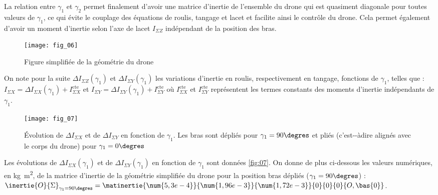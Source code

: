 \ifprof
\begin{corrige}

\end{corrige}
\else
\fi


La relation entre $\gamma_1$ et $\gamma_2$ permet finalement d’avoir une matrice d’inertie de l’ensemble du
drone qui est quasiment diagonale pour toutes valeurs de $\gamma_1$, ce qui évite le couplage des
équations de roulis, tangage et lacet et facilite ainsi le contrôle du drone. Cela permet également d’avoir un moment d’inertie selon l’axe de lacet  $I_{\Sigma Z}$ indépendant de la position des
bras.

\begin{figure}[H]
\centering
\texttt{[image: fig\_06]}
\caption{\label{fig:06}  Figure simplifiée de la géométrie du drone}
\end{figure}

On note pour la suite $\Delta I_{\Sigma Z} (\gamma_1)$ et $\Delta I_{\Sigma Y} (\gamma_1)$  les variations d’inertie en roulis, respectivement en tangage, fonctions de $\gamma_1$, 
telles que : $I_{\Sigma X} = \Delta I_{\Sigma X} (\gamma_1) + I_{\Sigma X}^{\text{cte}}$ 
et 
$I_{\Sigma Y} = \Delta I_{\Sigma Y} (\gamma_1) + I_{\Sigma Y}^{\text{cte}}$ 
où $I_{\Sigma X}^{\text{cte}}$ et $I_{\Sigma Y}^{\text{cte}}$
représentent les termes constants des moments d’inertie indépendants de $\gamma_1$.


\begin{figure}[H]
\centering
\texttt{[image: fig\_07]}
\caption{\label{fig:07}  Évolution de $\Delta I_{\Sigma X}$ et de $\Delta I_{\Sigma Y}$ en fonction de $\gamma_1$. Les bras sont dépliés pour $\gamma_1 = 90\degres$
et pliés (c’est-­-à­dire alignés avec le corps du drone) pour $\gamma_1 = 0\degres$}
\end{figure}

Les évolutions de $\Delta I_{\Sigma X} (\gamma_1)$ et de $\Delta I_{\Sigma Y} (\gamma_1)$ en fonction de $\gamma_1$ sont données \autoref{fig:07}. On donne
de plus ci-­dessous les valeurs numériques, en \si{kg.m^2}, de la matrice d’inertie de la géométrie
simplifiée du drone pour la position bras dépliés ($\gamma_1 = 90\degres$) :
$\inertie{O}{\Sigma}_{\gamma_1 = 90\degres} = \matinertie{\num{5,3e-4}}{\num{1,96e-3}}{\num{1,72e-3}}{0}{0}{0}{O,\bas{0}}$.

